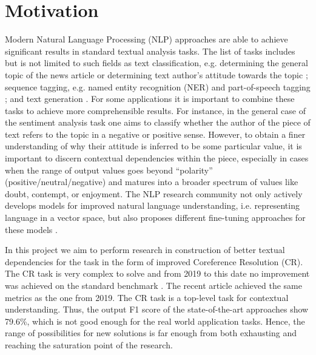 
\section{Motivation}\label{sec:motication}

Modern Natural Language Processing (NLP) approaches are able to achieve significant results in standard textual analysis tasks. 
The list of tasks includes but is not limited to such fields as text classification, e.g. determining the general topic of the news article \cite{text-classification-Altinel2018} or determining text author's attitude towards the topic \cite{sentiment-analysis-Medhat2014}; sequence tagging,  e.g. named entity recognition (NER)  \cite{ner-Strakova2019,ner-Zhanming2019,ner-Yamada2020,ner-Luoma2020} and part-of-speech tagging \cite{pos-tagging-Bohnet2018}; and text generation \cite{text-gen-Guo2017}. For some applications it is important to combine these tasks to achieve more comprehensible results. 
For instance, in the general case of the sentiment analysis task one aims to classify  whether the author of the piece of text refers to the topic in a negative or positive sense. However, to obtain a finer understanding of why their attitude is inferred to be some particular value, it is important to discern contextual dependencies within the piece, especially in cases when the range of output values goes beyond “polarity” (positive/neutral/negative) and matures into a broader spectrum of values like doubt, contempt, or enjoyment. 
The NLP research community not only actively develops models for improved natural language understanding, i.e. representing language in a vector space, \cite{gpt-Radford2018,bert-Devlin2019,xlnet-Yang2020} but also proposes different fine-tuning approaches for these models \cite{robarta-Liu2019,cr-Joshi2019,gpt2-Radford2019,gpt3-Brown2020}. 

In this project we aim to perform research in construction of better textual dependencies for the task in the form of improved Coreference Resolution (CR). 
The CR task is very complex to solve and from 2019 to this date \cite{cr-Joshi2019} no improvement was achieved on the standard benchmark \cite{ontonotes5-Weischedel2013}. 
The recent article \cite{cr-Toshniwal2020} achieved the same metrics as the one from 2019. 
The CR task is a top-level task for contextual understanding. Thus, the output F1 score of the state-of-the-art approaches show 79.6\%, which is not good enough for the real world application tasks. Hence, the range of possibilities for new solutions is far enough from both exhausting and reaching the saturation point of the research.
 

